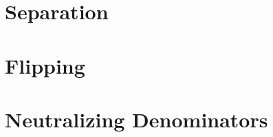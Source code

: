 \documentclass[inequalities.tex]{subfile}
\begin{document}
	\section{Separation}
	
	\section{Flipping}
	
	\section{Neutralizing Denominators}
\end{document}
